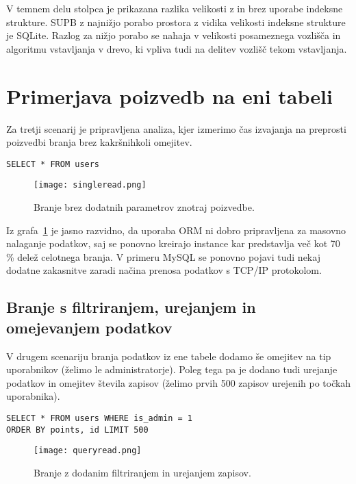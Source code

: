 \documentclass[a4paper,12pt,openright]{book}
\begin{document}
    V temnem delu stolpca je prikazana razlika velikosti z in brez uporabe indeksne strukture. SUPB z najnižjo porabo prostora z vidika velikosti indeksne strukture je SQLite. Razlog za nižjo porabo se nahaja v velikosti posameznega vozlišča in algoritmu vstavljanja v drevo, ki vpliva tudi na delitev vozlišč tekom vstavljanja.

    \section{Primerjava poizvedb na eni tabeli}

    Za tretji scenarij je pripravljena analiza, kjer izmerimo čas izvajanja na preprosti poizvedbi branja brez kakršnihkoli omejitev.
    
\begin{verbatim}
SELECT * FROM users
\end{verbatim}
    

    \begin{figure}[H]
        \centerline{\texttt{[image: singleread.png]}}
        \caption{Branje brez dodatnih parametrov znotraj poizvedbe.}
        \label{branje}
    \end{figure}

    \noindent
    Iz grafa~\ref{branje} je jasno razvidno, da uporaba ORM ni dobro pripravljena za masovno nalaganje podatkov, saj se ponovno kreirajo instance kar predstavlja več kot 70 \% delež celotnega branja. V primeru MySQL se ponovno pojavi tudi nekaj dodatne zakasnitve zaradi načina prenosa podatkov s TCP/IP protokolom.

    \subsection{Branje s filtriranjem, urejanjem in omejevanjem podatkov}

    V drugem scenariju branja podatkov iz ene tabele dodamo še omejitev na tip uporabnikov (želimo le administratorje). Poleg tega pa je dodano tudi urejanje podatkov in omejitev števila zapisov (želimo prvih 500 zapisov urejenih po točkah uporabnika).

\begin{verbatim}
SELECT * FROM users WHERE is_admin = 1
ORDER BY points, id LIMIT 500
\end{verbatim}
    
    \begin{figure}[H]
        \centerline{\texttt{[image: queryread.png]}}
        \caption{Branje z dodanim filtriranjem in urejanjem zapisov.}
        \label{queryread}
    \end{figure}
\end{document}
